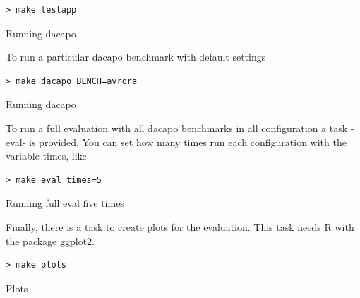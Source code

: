 \begin{listing}
\begin{verbatim}
> make testapp
\end{verbatim}
\caption{Running dacapo}
\label{usage-parse3}
\end{listing}

To run a particular dacapo benchmark with default settings

\begin{listing}
\begin{verbatim}
> make dacapo BENCH=avrora
\end{verbatim}
\caption{Running dacapo}
\label{usage-parse4}
\end{listing}

To run a full evaluation with all dacapo benchmarks in all configuration a task -eval- is provided. You can set how many times run each configuration with the variable times, like

\begin{listing}
\begin{verbatim}
> make eval times=5
\end{verbatim}
\caption{Running full eval five times}
\label{usage-parse5}
\end{listing}

Finally, there is a task to create plots for the evaluation.
This task needs R with the package ggplot2.

\begin{listing}
\begin{verbatim}
> make plots
\end{verbatim}
\caption{Plots}
\label{usage-parse6}
\end{listing}
